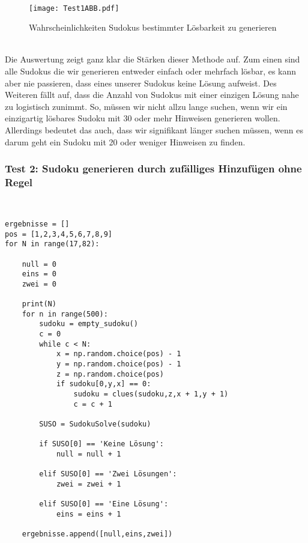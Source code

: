 \documentclass[11pt,a4paper]{article}
\begin{document}
\ \\
\begin{figure}[htbp!]
\begin{center}
\texttt{[image: Test1ABB.pdf]}
\end{center}
\caption{Wahrscheinlichkeiten Sudokus bestimmter Lösbarkeit zu generieren}
\end{figure}
\ \\ 
Die Auswertung zeigt ganz klar die Stärken dieser Methode auf. Zum einen sind alle Sudokus die wir generieren entweder einfach oder mehrfach lösbar, es kann aber nie passieren, dass eines unserer Sudokus keine Lösung aufweist. Des Weiteren fällt auf, dass die Anzahl von Sudokus mit einer einzigen Lösung nahe zu logistisch zunimmt. So, müssen wir nicht allzu lange suchen, wenn wir ein einzigartig lösbares Sudoku mit 30 oder mehr Hinweisen generieren wollen.
Allerdings bedeutet das auch, dass wir signifikant länger suchen müssen, wenn es darum geht ein Sudoku mit 20 oder weniger Hinweisen zu finden.
 
\subsubsection{Test 2: Sudoku generieren durch zufälliges Hinzufügen ohne Regel}
\ \\
\begin{verbatim}
ergebnisse = []                       
pos = [1,2,3,4,5,6,7,8,9]             
for N in range(17,82):                

    null = 0                          
    eins = 0                          
    zwei = 0                          
    
    print(N)                          
    for n in range(500):              
        sudoku = empty_sudoku()       
        c = 0                         
        while c < N:                                     
            x = np.random.choice(pos) - 1                
            y = np.random.choice(pos) - 1                
            z = np.random.choice(pos)                    
            if sudoku[0,y,x] == 0:                       
                sudoku = clues(sudoku,z,x + 1,y + 1)     
                c = c + 1                                
        
        SUSO = SudokuSolve(sudoku)         
        
        if SUSO[0] == 'Keine Lösung':     
            null = null + 1               
                                           
        elif SUSO[0] == 'Zwei Lösungen':   
            zwei = zwei + 1                
                                           
        elif SUSO[0] == 'Eine Lösung':     
            eins = eins + 1                
            
    ergebnisse.append([null,eins,zwei]) 
\end{verbatim}
\ \\
\end{document}
